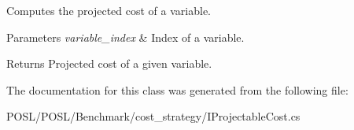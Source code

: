 Computes the projected cost of a variable. 


\begin{DoxyParams}{Parameters}
{\em variable\+\_\+index} & Index of a variable. \\
\hline
\end{DoxyParams}
\begin{DoxyReturn}{Returns}
Projected cost of a given variable. 
\end{DoxyReturn}


The documentation for this class was generated from the following file\+:\begin{DoxyCompactItemize}
\item 
P\+O\+S\+L/\+P\+O\+S\+L/\+Benchmark/cost\+\_\+strategy/I\+Projectable\+Cost.\+cs\end{DoxyCompactItemize}
